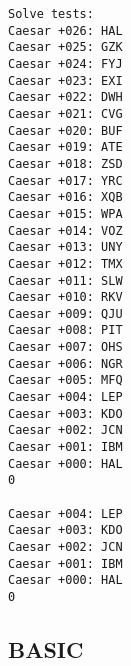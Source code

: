 \documentclass[letterpaper, 10pt, DIV=13]{scrartcl}
\numberwithin{equation}{section}
\numberwithin{figure}{section}
\numberwithin{table}{section}
\begin{document}
\begin{lstlisting}[frame=single, caption = COBOL Output]
Solve tests:
Caesar +026: HAL                             
Caesar +025: GZK                             
Caesar +024: FYJ                             
Caesar +023: EXI                             
Caesar +022: DWH                             
Caesar +021: CVG                             
Caesar +020: BUF                             
Caesar +019: ATE                             
Caesar +018: ZSD                             
Caesar +017: YRC                             
Caesar +016: XQB                             
Caesar +015: WPA                             
Caesar +014: VOZ                             
Caesar +013: UNY                             
Caesar +012: TMX                             
Caesar +011: SLW                             
Caesar +010: RKV                             
Caesar +009: QJU                             
Caesar +008: PIT                             
Caesar +007: OHS                             
Caesar +006: NGR                             
Caesar +005: MFQ                             
Caesar +004: LEP                             
Caesar +003: KDO                             
Caesar +002: JCN                             
Caesar +001: IBM                             
Caesar +000: HAL                             
0
 
Caesar +004: LEP                             
Caesar +003: KDO                             
Caesar +002: JCN                             
Caesar +001: IBM                             
Caesar +000: HAL                             
0
\end{lstlisting}

\subsection{BASIC}
\end{document}
